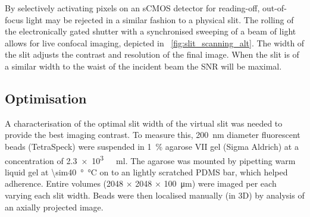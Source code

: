 By selectively activating pixels on an \gls{sCMOS} detector for reading-off, out-of-focus light may be rejected in a similar fashion to a physical slit.
The rolling of the electronically gated shutter with a synchronised sweeping of a beam of light allows for live confocal imaging, depicted in \figurename~\ref{fig:slit_scanning_alt}.
The width of the slit adjusts the contrast and resolution of the final image.
When the slit is of a similar width to the waist of the incident beam the \gls{SNR} will be maximal.


\subsection{Optimisation}

A characterisation of the optimal slit width of the virtual slit was needed to provide the best imaging contrast.
To measure this, \SI{200}{\nano\metre} diameter fluorescent beads (TetraSpeck) were suspended in \SI{1}{\percent} \gls{agarose VII} gel (Sigma Aldrich) at a concentration of \SI{2.3e3}{ \per\milli\litre}.
The agarose was mounted by pipetting warm liquid gel at \SI{\sim40}{\degree\celsius} on to an lightly scratched PDMS bar, which helped adherence.
Entire volumes (\SI{2048}{} \(\times \) \SI{2048}{} \(\times \) \SI{100}{\micro\metre}) were imaged per each varying each slit width.
Beads were then localised manually (in 3D) by analysis of an axially projected image. %


